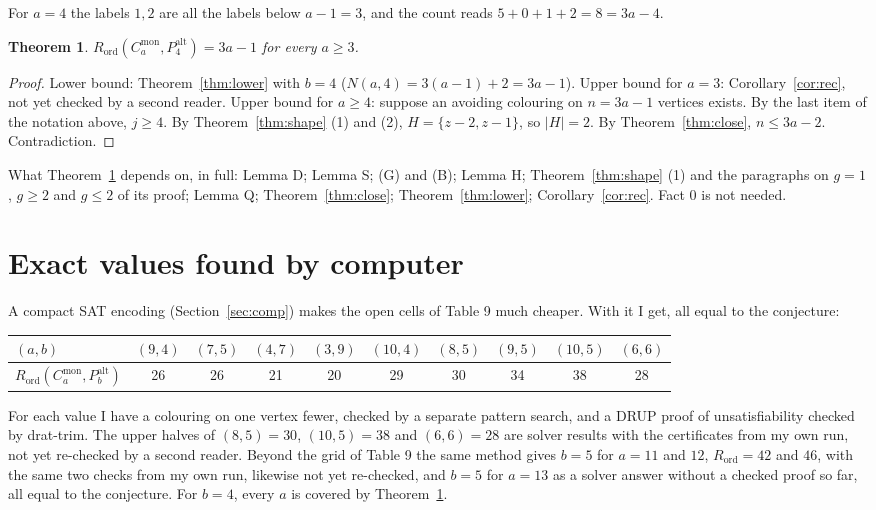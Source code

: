 \documentclass[11pt]{article}
\newcommand{\Rord}{R_{\mathrm{ord}}}
\newcommand{\Cmon}[1]{C_{#1}^{\mathrm{mon}}}
\newcommand{\Palt}[1]{P_{#1}^{\mathrm{alt}}}
\theoremstyle{plain}
\newtheorem{theorem}{Theorem}
\theoremstyle{remark}
\begin{document}
For $a = 4$ the labels $1, 2$ are all the labels below $a-1 = 3$, and the count reads $5 + 0 + 1 + 2 = 8 = 3a-4$.

\begin{theorem}\label{thm:b4}
$\Rord(\Cmon{a}, \Palt{4}) = 3a-1$ for every $a \geq 3$.
\end{theorem}

\begin{proof}
Lower bound: Theorem~\ref{thm:lower} with $b = 4$ ($N(a,4) = 3(a-1) + 2 = 3a-1$). Upper bound for $a = 3$:
Corollary~\ref{cor:rec}, not yet checked by a second reader. Upper bound for $a \geq 4$: suppose an avoiding
colouring on $n = 3a-1$ vertices exists. By the last item of the notation above, $j \geq 4$. By
Theorem~\ref{thm:shape} (1) and (2), $H = \{z-2, z-1\}$, so $|H| = 2$. By Theorem~\ref{thm:close}, $n \leq 3a-2$.
Contradiction.
\end{proof}

What Theorem~\ref{thm:b4} depends on, in full: Lemma D; Lemma S; (G) and (B); Lemma H;
Theorem~\ref{thm:shape} (1) and the paragraphs on $g = 1$, $g \geq 2$ and $g \leq 2$ of its proof; Lemma Q;
Theorem~\ref{thm:close}; Theorem~\ref{thm:lower}; Corollary~\ref{cor:rec}. Fact 0 is not needed.

\section{Exact values found by computer}\label{sec:values}

A compact SAT encoding (Section~\ref{sec:comp}) makes the open cells of Table 9 much cheaper. With it I get, all
equal to the conjecture:

\begin{center}
\begin{tabular}{lccccccccc}
\toprule
$(a,b)$ & $(9,4)$ & $(7,5)$ & $(4,7)$ & $(3,9)$ & $(10,4)$ & $(8,5)$ & $(9,5)$ & $(10,5)$ & $(6,6)$ \\
\midrule
$\Rord(\Cmon{a}, \Palt{b})$ & 26 & 26 & 21 & 20 & 29 & 30 & 34 & 38 & 28 \\
\bottomrule
\end{tabular}
\end{center}

For each value I have a colouring on one vertex fewer, checked by a separate pattern search, and a DRUP proof of
unsatisfiability checked by drat-trim. The upper halves of $(8,5) = 30$, $(10,5) = 38$ and $(6,6) = 28$ are solver
results with the certificates from my own run, not yet re-checked by a second reader. Beyond the grid of Table 9 the
same method gives $b = 5$ for $a = 11$ and $12$, $\Rord = 42$ and $46$, with the same two checks from my own run,
likewise not yet re-checked, and $b = 5$ for $a = 13$ as a solver answer without a checked proof so far, all equal
to the conjecture. For $b = 4$, every $a$ is covered by Theorem~\ref{thm:b4}.
\end{document}
